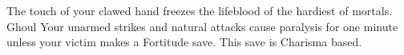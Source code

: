 \shortdescfeat
{The touch of your clawed hand freezes the lifeblood of the hardiest of mortals.}
{Ghoul}
{Your unarmed strikes and natural attacks cause paralysis for one minute unless your victim makes a Fortitude save. This save is Charisma based.}